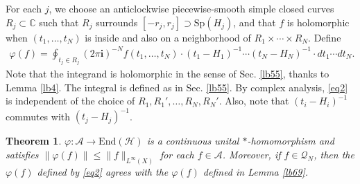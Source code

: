 \documentclass[12pt,a4paper,notitlepage]{article}
\theoremstyle{definition}
\theoremstyle{plain}
\newtheorem{thm}[df]{Theorem}
\newcommand{\mc}{\mathcal}
\newcommand{\End}{\mathrm{End}} %
\newcommand{\im}{\mathbf{i}}
\newcommand{\Cbb}{\mathbb C}
\newcommand{\Sp}{\mathrm{Sp}}
\numberwithin{equation}{section}
\begin{document}
For each $j$, we choose an anticlockwise piecewise-smooth simple closed curves $R_j\subset\Cbb$ such that $R_j$ surrounds $[-r_j,r_j]\supset \Sp(H_j)$,  and that $ f$ is holomorphic when $(t_1,\dots,t_N)$ is inside and also on a neighborhood of $R_1\times  \cdots\times R_N$. Define
\begin{align}
\varphi( f)=\oint_{t_j\in R_j}(2\pi\im)^{-N} f(t_1,\dots,t_N)\cdot(t_1-H_1)^{-1}\cdots(t_N-H_N)^{-1}\cdot dt_1\cdots dt_N.	\label{eq2}
\end{align}
Note that the integrand is holomorphic in the sense of Sec. \ref{lb55}, thanks to Lemma \ref{lb4}. The integral is defined as in Sec. \ref{lb55}. By complex analysis,  \eqref{eq2} is independent of the choice of $R_1,R_1',\dots,R_N,R_N'$. Also, note that $(t_i-H_i)^{-1}$ commutes with $(t_j-H_j)^{-1}$.



\begin{thm}\label{lb2}
$\varphi:\mc A\rightarrow\End(\mc H)$ is a continuous unital $*$-homomorphism and satisfies $\lVert\varphi( f)\lVert\leq \lVert  f\lVert_{L^\infty(X)}$ for each $ f\in\mc A$.  Moreover, if $f\in\mc Q_N$, then the $\varphi( f)$ defined by \eqref{eq2} agrees with the $\varphi(f)$ defined in Lemma \ref{lb69}. 
\end{thm}
\end{document}
